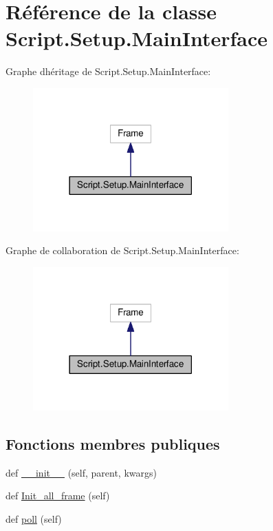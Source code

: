 \hypertarget{classScript_1_1Setup_1_1MainInterface}{}\section{Référence de la classe Script.\+Setup.\+Main\+Interface}
\label{classScript_1_1Setup_1_1MainInterface}


Graphe d\textquotesingle{}héritage de Script.\+Setup.\+Main\+Interface\+:\nopagebreak
\begin{figure}[H]
\begin{center}
\leavevmode
\includegraphics[width=213pt]{classScript_1_1Setup_1_1MainInterface__inherit__graph}
\end{center}
\end{figure}


Graphe de collaboration de Script.\+Setup.\+Main\+Interface\+:\nopagebreak
\begin{figure}[H]
\begin{center}
\leavevmode
\includegraphics[width=213pt]{classScript_1_1Setup_1_1MainInterface__coll__graph}
\end{center}
\end{figure}
\subsection*{Fonctions membres publiques}
\begin{DoxyCompactItemize}
\item 
def \hyperlink{classScript_1_1Setup_1_1MainInterface_a342ef881ed8e49715e8e071026290d33}{\+\_\+\+\_\+init\+\_\+\+\_\+} (self, parent, kwargs)
\item 
def \hyperlink{classScript_1_1Setup_1_1MainInterface_aaa122e78c353c8b0014b07ff944d7818}{Init\+\_\+all\+\_\+frame} (self)
\item 
def \hyperlink{classScript_1_1Setup_1_1MainInterface_a92190b04a1cf9aa5497439f2dd6dcd99}{poll} (self)
\end{DoxyCompactItemize}
